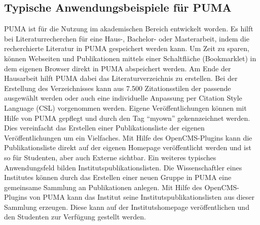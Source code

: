 \subsection{Typische Anwendungsbeispiele für PUMA}
PUMA ist für die Nutzung im akademischen Bereich entwickelt worden.
Es hilft bei Literaturrecherchen für eine Haus-, Bachelor- oder Masterarbeit, indem die recherchierte Literatur in PUMA gespeichert werden kann. Um Zeit zu sparen, können Webseiten und Publikationen mittels einer Schaltfläche (Bookmarklet) in dem eigenen Browser direkt in PUMA abspeichert werden. Am Ende der Hausarbeit hilft PUMA dabei das Literaturverzeichnis zu erstellen. Bei der Erstellung des Verzeichnisses kann aus 7.500 Zitationsstilen der passende ausgewählt werden oder auch eine individuelle Anpassung per Citation Style Language (CSL) vorgenommen werden.
\newline 
Eigene Veröffentlichungen können mit Hilfe von PUMA gepflegt und  durch den Tag \enquote{myown} gekennzeichnet werden. Dies vereinfacht das Erstellen einer Publikationsliste der eigenen Veröffentlichungen um ein Vielfaches. Mit Hilfe des OpenCMS-Plugins kann die Publikationsliste direkt auf der eigenen Homepage veröffentlicht werden und ist so für Studenten, aber auch Externe sichtbar.
\newline 
Ein weiteres typisches Anwendungsfeld bilden Institutspublikationslisten. Die Wissenschaftler eines Institutes können durch das Erstellen einer neuen Gruppe in PUMA eine gemeinsame Sammlung an Publikationen anlegen. Mit Hilfe des OpenCMS-Plugins von PUMA kann das Institut seine Institutspublikationslisten aus dieser Sammlung erzeugen. Diese kann auf der Institutshomepage veröffentlichen und den Studenten zur Verfügung gestellt werden.

   
